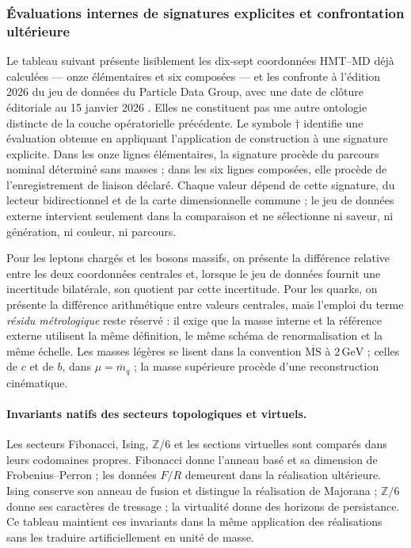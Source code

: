 
\subsubsection{Évaluations internes de signatures explicites et confrontation ultérieure}

Le tableau suivant présente lisiblement les dix-sept coordonnées HMT--MD déjà
calculées --- onze élémentaires et six composées --- et les confronte à
l'édition 2026 du jeu de données du Particle Data Group, avec une date de clôture
éditoriale au 15 janvier 2026 \cite{PDG2026}. Elles ne constituent pas une autre ontologie
distincte de la couche opératorielle précédente. Le symbole \(\dagger\)
identifie une évaluation obtenue en appliquant l'application de construction à une signature
explicite. Dans les onze lignes élémentaires, la signature procède du parcours nominal
déterminé sans masses ; dans les six lignes composées, elle procède de l'enregistrement de liaison
déclaré. Chaque valeur dépend de cette signature, du lecteur bidirectionnel et de la carte
dimensionnelle commune ; le jeu de données externe intervient seulement dans la comparaison
et ne sélectionne ni saveur, ni génération, ni couleur, ni parcours.


Pour les leptons chargés et les bosons massifs, on présente la différence relative entre
les deux coordonnées centrales et, lorsque le jeu de données fournit une incertitude
bilatérale, son quotient par cette incertitude. Pour les quarks, on présente la
différence arithmétique entre valeurs centrales, mais l'emploi du terme
\emph{résidu métrologique} reste réservé : il exige que la masse interne et la référence externe
utilisent la même définition, le même schéma de renormalisation et la même échelle.
Les masses légères se lisent dans la convention \(\overline{\mathrm{MS}}\) à
\(2\,\mathrm{GeV}\) ; celles de \(c\) et de \(b\), dans
\(\mu=\overline m_q\) ; la masse supérieure procède d'une reconstruction cinématique.



\paragraph{Invariants natifs des secteurs topologiques et virtuels.}
Les secteurs Fibonacci, Ising, \(\mathbb Z/6\) et les sections virtuelles sont comparés
dans leurs codomaines propres. Fibonacci donne l'anneau basé et sa dimension de
Frobenius--Perron ; les données \(F/R\) demeurent dans la réalisation ultérieure. Ising
conserve son anneau de fusion et distingue la réalisation de Majorana ; \(\mathbb Z/6\)
donne ses caractères de tressage ; la virtualité donne des horizons de
persistance. Ce
tableau maintient ces invariants dans la même application des réalisations sans les traduire
artificiellement en unité de masse.

